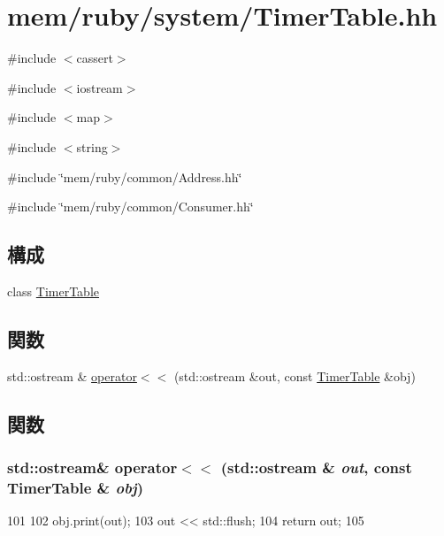\hypertarget{TimerTable_8hh}{
\section{mem/ruby/system/TimerTable.hh}
\label{TimerTable_8hh}
}
{\ttfamily \#include $<$cassert$>$}\par
{\ttfamily \#include $<$iostream$>$}\par
{\ttfamily \#include $<$map$>$}\par
{\ttfamily \#include $<$string$>$}\par
{\ttfamily \#include \char`\"{}mem/ruby/common/Address.hh\char`\"{}}\par
{\ttfamily \#include \char`\"{}mem/ruby/common/Consumer.hh\char`\"{}}\par
\subsection*{構成}
\begin{DoxyCompactItemize}
\item 
class \hyperlink{classTimerTable}{TimerTable}
\end{DoxyCompactItemize}
\subsection*{関数}
\begin{DoxyCompactItemize}
\item 
std::ostream \& \hyperlink{TimerTable_8hh_aa6f379d16fde602044421bc900acbdc1}{operator$<$$<$} (std::ostream \&out, const \hyperlink{classTimerTable}{TimerTable} \&obj)
\end{DoxyCompactItemize}


\subsection{関数}
\hypertarget{TimerTable_8hh_aa6f379d16fde602044421bc900acbdc1}{
\subsubsection[{operator$<$$<$}]{\setlength{\rightskip}{0pt plus 5cm}std::ostream\& operator$<$$<$ (std::ostream \& {\em out}, \/  const {\bf TimerTable} \& {\em obj})}}
\label{TimerTable_8hh_aa6f379d16fde602044421bc900acbdc1}



\begin{DoxyCode}
101 {
102     obj.print(out);
103     out << std::flush;
104     return out;
105 }
\end{DoxyCode}
